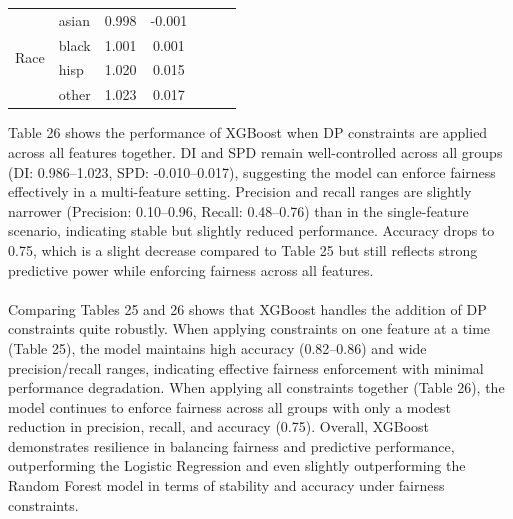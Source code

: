 \documentclass{article}
\begin{document}
\begin{table}[H]
\begin{tabular}{llcc|ccc}
\hline
\multirow{4}{*}{Race}          & asian & 0.998                  & \multicolumn{1}{c|}{-0.001} &                                       &                                    &                              \\
                               & black & 1.001                  & \multicolumn{1}{c|}{0.001}  &                                       &                                    &                              \\
                               & hisp  & 1.020                  & \multicolumn{1}{c|}{0.015}  &                                       &                                    &                              \\
                               & other & 1.023                  & \multicolumn{1}{c|}{0.017}  &                                       &                                    &                             
\end{tabular}
\end{table}
Table 26 shows the performance of XGBoost when DP constraints are applied across all features together. DI and SPD remain well-controlled across all groups (DI: 0.986–1.023, SPD: -0.010–0.017), suggesting the model can enforce fairness effectively in a multi-feature setting. Precision and recall ranges are slightly narrower (Precision: 0.10–0.96, Recall: 0.48–0.76) than in the single-feature scenario, indicating stable but slightly reduced performance. Accuracy drops to 0.75, which is a slight decrease compared to Table 25 but still reflects strong predictive power while enforcing fairness across all features.\\ \\
Comparing Tables 25 and 26 shows that XGBoost handles the addition of DP constraints quite robustly. When applying constraints on one feature at a time (Table 25), the model maintains high accuracy (0.82–0.86) and wide precision/recall ranges, indicating effective fairness enforcement with minimal performance degradation. When applying all constraints together (Table 26), the model continues to enforce fairness across all groups with only a modest reduction in precision, recall, and accuracy (0.75). Overall, XGBoost demonstrates resilience in balancing fairness and predictive performance, outperforming the Logistic Regression and even slightly outperforming the Random Forest model in terms of stability and accuracy under fairness constraints.
\end{document}
